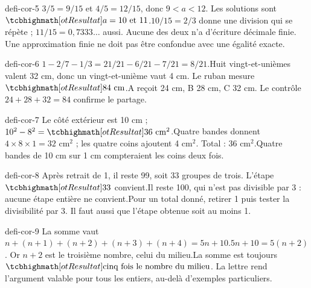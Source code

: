 \begin{blocEdition}{defi-cor-5}
$3/5=9/15$ et $4/5=12/15$, donc $9<a<12$. Les solutions sont $\res{a=10\text{ et }11}$.$10/15=2/3$ donne une division qui se répète ; $11/15=0{,}7333\ldots$ aussi. Aucune des deux n’a d’écriture décimale finie. Une approximation finie ne doit pas être confondue avec une égalité exacte.
\end{blocEdition}
\begin{blocEdition}{defi-cor-6}
$1-2/7-1/3=21/21-6/21-7/21=8/21$.Huit vingt-et-unièmes valent 32 cm, donc un vingt-et-unième vaut 4 cm. Le ruban mesure $\res{84\ \mathrm{cm}}$.A reçoit 24 cm, B 28 cm, C 32 cm. Le contrôle $24+28+32=84$ confirme le partage.
\end{blocEdition}
\begin{blocEdition}{defi-cor-7}
Le côté extérieur est 10 cm ; $10^2-8^2=\res{36\ \mathrm{cm}^2}$.Quatre bandes donnent $4\times8\times1=32$ cm$^2$ ; les quatre coins ajoutent 4 cm$^2$. Total : 36 cm$^2$.Quatre bandes de 10 cm sur 1 cm compteraient les coins deux fois.\label{fig-defi-cor-7}

\end{blocEdition}
\begin{blocEdition}{defi-cor-8}
Après retrait de 1, il reste 99, soit 33 groupes de trois. L’étape $\res{33}$ convient.Il reste 100, qui n’est pas divisible par 3 : aucune étape entière ne convient.Pour un total donné, retirer 1 puis tester la divisibilité par 3. Il faut aussi que l’étape obtenue soit au moins 1.\label{fig-defi-cor-8}

\end{blocEdition}
\begin{blocEdition}{defi-cor-9}
La somme vaut $n+(n+1)+(n+2)+(n+3)+(n+4)=5n+10$.$5n+10=5(n+2)$. Or $n+2$ est le troisième nombre, celui du milieu.La somme est toujours $\res{\text{cinq fois le nombre du milieu}}$. La lettre rend l’argument valable pour tous les entiers, au-delà d’exemples particuliers.
\end{blocEdition}
